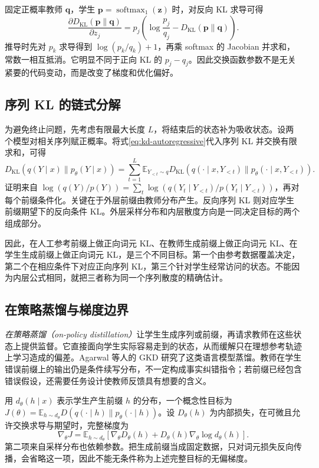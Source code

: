 \documentclass[UTF8,12pt,a4paper,fontset=fandol]{ctexart}
\begin{document}
固定正概率教师 $\mathbf q$，学生 $\mathbf p=\operatorname{softmax}_1(\mathbf z)$ 时，对反向 KL 求导可得
\begin{equation}
 \frac{\partial D_{\mathrm{KL}}(\mathbf p\|\mathbf q)}{\partial z_j}
 =p_j\left(\log\frac{p_j}{q_j}
             -D_{\mathrm{KL}}(\mathbf p\|\mathbf q)\right).
 \label{eq:kd-reverse-gradient}
\end{equation}
推导时先对 $p_k$ 求导得到 $\log(p_k/q_k)+1$，再乘 softmax 的 Jacobian 并求和，常数一相互抵消。它明显不同于正向 KL 的 $p_j-q_j$。因此交换函数参数不是无关紧要的代码变动，而是改变了梯度和优化偏好。

\subsection{序列 KL 的链式分解}
为避免终止问题，先考虑有限最大长度 $L$，将结束后的状态补为吸收状态。设两个模型对相关序列赋正概率。将式\eqref{eq:kd-autoregressive}代入序列 KL 并交换有限求和，可得
\begin{equation}
 D_{\mathrm{KL}}(q(Y\mid x)\|p_\theta(Y\mid x))
 =\sum_{t=1}^L\mathbb E_{Y_{<t}\sim q}
 D_{\mathrm{KL}}\left(q(\cdot\mid x,Y_{<t})\|
 p_\theta(\cdot\mid x,Y_{<t})\right).
 \label{eq:kd-sequence-chain}
\end{equation}
证明来自 $\log(q(Y)/p(Y))=\sum_t\log(q(Y_t\mid Y_{<t})/p(Y_t\mid Y_{<t}))$，再对每个前缀条件化。关键在于外层前缀由教师分布产生。反向序列 KL 则对应学生前缀期望下的反向条件 KL。外层采样分布和内层散度方向是一同决定目标的两个组成部分。

因此，在人工参考前缀上做正向词元 KL、在教师生成前缀上做正向词元 KL、在学生生成前缀上做正向词元 KL，是三个不同目标。第一个由参考数据覆盖决定，第二个在相应条件下对应正向序列 KL，第三个针对学生经常访问的状态。不能因为内层公式相同，就把三者称为同一个序列散度的精确估计。

\subsection{在策略蒸馏与梯度边界}
\emph{在策略蒸馏（on-policy distillation）}让学生生成序列或前缀，再请求教师在这些状态上提供监督。它直接面向学生实际容易走到的状态，从而缓解只在理想参考轨迹上学习造成的偏差。Agarwal 等人的 GKD 研究了这类语言模型蒸馏\cite{agarwal2024}。教师在学生错误前缀上的输出仍是条件续写分布，不一定构成事实纠错指令；若前缀已经包含错误假设，还需要任务设计使教师反馈具有想要的含义。

用 $d_\theta(h\mid x)$ 表示学生产生前缀 $h$ 的分布，一个概念性目标为 $J(\theta)=\mathbb E_{h\sim d_\theta}D(q(\cdot\mid h)\|p_\theta(\cdot\mid h))$。设 $D_\theta(h)$ 为内部损失，在可微且允许交换求导与期望时，完整梯度为
\begin{equation}
 \nabla_\theta J
 =\mathbb E_{h\sim d_\theta}\left[
 \nabla_\theta D_\theta(h)
 +D_\theta(h)\nabla_\theta\log d_\theta(h)\right].
 \label{eq:kd-onpolicy-gradient}
\end{equation}
第二项来自采样分布也依赖参数。把生成前缀当成固定数据，只对词元损失反向传播，会省略这一项，因此不能无条件称为上述完整目标的无偏梯度。
\end{document}
